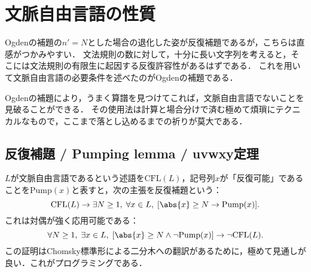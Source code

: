 \section{文脈自由言語の性質}

\begin{tcolorbox}[colframe=ForestGreen, colback=ForestGreen!10!white, breakable]
    Ogdenの補題の$n'=N$とした場合の退化した姿が反復補題であるが，こちらは直感がつかみやすい．
    文法規則の数に対して，十分に長い文字列を考えると，そこには文法規則の有限生に起因する反復許容性があるはずである．
    これを用いて文脈自由言語の必要条件を述べたのがOgdenの補題である．

    Ogdenの補題により，うまく算譜を見つけてこれば，文脈自由言語でないことを見破ることができる．
    その使用法は計算と場合分けで済む極めて煩瑣にテクニカルなもので，ここまで落とし込めるまでの祈りが莫大である．
\end{tcolorbox}

\subsection{反復補題 / Pumping lemma / uvwxy定理}

\begin{tcolorbox}[colframe=ForestGreen, colback=ForestGreen!10!white, breakable]
    $L$が文脈自由言語であるという述語を$\mathrm{CFL}(L)$，記号列$x$が「反復可能」であることを$\mathrm{Pump}(x)$と表すと，次の主張を反復補題という：
    \[\mathrm{CFL}(L)\to\exists N\ge 1,\;\forall x\in L,\;[\abs{x}\ge N\to\mathrm{Pump}(x)].\]
    これは対偶が強く応用可能である：
    \[\forall N\ge 1,\;\exists x\in L,\;[\abs{x}\ge N\land \lnot\mathrm{Pump}(x)]\to \lnot\mathrm{CFL}(L).\]
    この証明はChomsky標準形による二分木への翻訳があるために，極めて見通しが良い．これがプログラミングである．
\end{tcolorbox}

